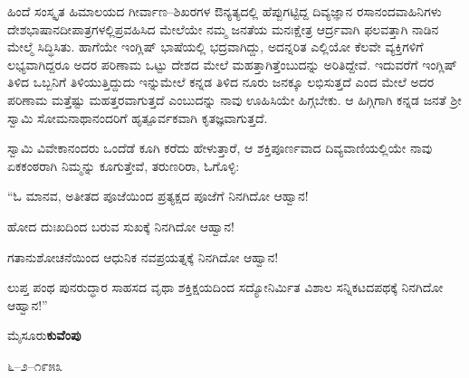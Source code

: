 \vskip 2pt

ಹಿಂದೆ ಸಂಸ್ಕೃತ ಹಿಮಾಲಯದ ಗೀರ್ವಾಣ–ಶಿಖರಗಳ ಔನ್ಯತ್ಯದಲ್ಲಿ ಹೆಪ್ಪುಗಟ್ಟಿದ್ದ ದಿವ್ಯಜ್ಞಾನ ರಸಾನಂದವಾಹಿನಿಗಳು ದೇಶಭಾಷಾನದೀಪಾತ್ರಗಳಲ್ಲಿ\break ಪ್ರವಹಿಸಿದ ಮೇಲೆಯೇ ನಮ್ಮ ಜನತೆಯ ಮನಃಕ್ಷೇತ್ರ ಆರ್ದ್ರವಾಗಿ ಫಲವತ್ತಾಗಿ ನಾಡಿನ ಮೇಲ್ಮೆ ಸಿದ್ಧಿಸಿತು. ಹಾಗೆಯೇ ಇಂಗ್ಲಿಷ್​ ಭಾಷೆಯಲ್ಲಿ ಭದ್ರವಾಗಿದ್ದು, ಅದನ್ನರಿತ ಎಲ್ಲಿಯೋ ಕೆಲವೇ ವ್ಯಕ್ತಿಗಳಿಗೆ ಲಭ್ಯವಾಗಿದ್ದರೂ ಅದರ ಪರಿಣಾಮ ಒಟ್ಟು ದೇಶದ ಮೇಲೆ ಮಹತ್ತಾಗಿತ್ತೆಂಬುದನ್ನು ಅರಿತಿದ್ದೇವೆ. ಇದುವರೆಗೆ ಇಂಗ್ಲಿಷ್​ ತಿಳಿದ ಒಬ್ಬನಿಗೆ ತಿಳಿಯುತ್ತಿದ್ದುದು ಇನ್ನುಮೇಲೆ ಕನ್ನಡ ತಿಳಿದ ನೂರು ಜನಕ್ಕೂ ಲಭಿಸುತ್ತದೆ ಎಂದ ಮೇಲೆ ಅದರ ಪರಿಣಾಮ ಮತ್ತೆಷ್ಟು ಮಹತ್ತರವಾಗುತ್ತದೆ ಎಂಬುದನ್ನು ನಾವು ಊಹಿಸಿಯೇ ಹಿಗ್ಗಬೇಕು. ಆ ಹಿಗ್ಗಿಗಾಗಿ ಕನ್ನಡ ಜನತೆ ಶ‍್ರೀ ಸ್ವಾಮಿ ಸೋಮನಾಥಾನಂದರಿಗೆ ಹೃತ್ಪೂರ್ವಕವಾಗಿ ಕೃತಜ್ಞವಾಗುತ್ತದೆ.

\vskip 2pt

ಸ್ವಾಮಿ ವಿವೇಕಾನಂದರು ಒಂದೆಡೆ ಕೂಗಿ ಕರೆದು ಹೇಳುತ್ತಾರೆ, ಆ ಶಕ್ತಿಪೂರ್ಣವಾದ ದಿವ್ಯವಾಣಿಯಲ್ಲಿಯೇ ನಾವು ಏಕಕಂಠರಾಗಿ ನಿಮ್ಮನ್ನು ಕೂಗುತ್ತೇವೆ, ತರುಣರಿರಾ, ಓಗೊಳ್ಳಿ:

\vskip 2pt

“ಓ ಮಾನವ, ಅತೀತದ ಪೂಜೆಯಿಂದ ಪ್ರತ್ಯಕ್ಷದ ಪೂಜೆಗೆ ನಿನಗಿದೋ ಆಹ್ವಾನ!

\vskip 2pt

ಹೋದ ದುಃಖದಿಂದ ಬರುವ ಸುಖಕ್ಕೆ ನಿನಗಿದೋ ಆಹ್ವಾನ!

\vskip 2pt

ಗತಾನುಶೋಚನೆಯಿಂದ ಆಧುನಿಕ ನವಪ್ರಯತ್ನಕ್ಕೆ ನಿನಗಿದೋ ಆಹ್ವಾನ!

\newpage

ಲುಪ್ತ ಪಂಥ ಪುನರುದ್ಧಾರ ಸಾಹಸದ ವೃಥಾ ಶಕ್ತಿಕ್ಷಯದಿಂದ ಸದ್ಯೋನಿರ್ಮಿತ ವಿಶಾಲ ಸನ್ನಿಕಟದಪಥಕ್ಕೆ ನಿನಗಿದೋ ಆಹ್ವಾನ!”

\bigskip

\noindent
ಮೈಸೂರು\hfill \textbf{ಕುವೆಂಪು}

\noindent
೬–೨–೧೯೫೩

